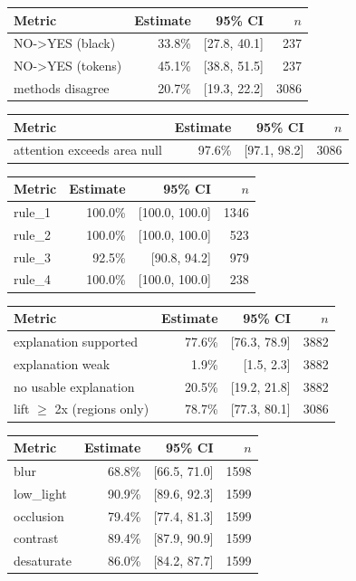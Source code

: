 \begin{tabular}{lrrr}
\toprule
Metric & Estimate & 95\% CI & $n$ \\
\midrule
NO->YES (black) & 33.8\% & [27.8, 40.1] & 237 \\
NO->YES (tokens) & 45.1\% & [38.8, 51.5] & 237 \\
methods disagree & 20.7\% & [19.3, 22.2] & 3086 \\
\bottomrule
\end{tabular}

\begin{tabular}{lrrr}
\toprule
Metric & Estimate & 95\% CI & $n$ \\
\midrule
attention exceeds area null & 97.6\% & [97.1, 98.2] & 3086 \\
\bottomrule
\end{tabular}

\begin{tabular}{lrrr}
\toprule
Metric & Estimate & 95\% CI & $n$ \\
\midrule
rule\_1 & 100.0\% & [100.0, 100.0] & 1346 \\
rule\_2 & 100.0\% & [100.0, 100.0] & 523 \\
rule\_3 & 92.5\% & [90.8, 94.2] & 979 \\
rule\_4 & 100.0\% & [100.0, 100.0] & 238 \\
\bottomrule
\end{tabular}

\begin{tabular}{lrrr}
\toprule
Metric & Estimate & 95\% CI & $n$ \\
\midrule
explanation supported & 77.6\% & [76.3, 78.9] & 3882 \\
explanation weak & 1.9\% & [1.5, 2.3] & 3882 \\
no usable explanation & 20.5\% & [19.2, 21.8] & 3882 \\
lift $\geq$ 2x (regions only) & 78.7\% & [77.3, 80.1] & 3086 \\
\bottomrule
\end{tabular}

\begin{tabular}{lrrr}
\toprule
Metric & Estimate & 95\% CI & $n$ \\
\midrule
blur & 68.8\% & [66.5, 71.0] & 1598 \\
low\_light & 90.9\% & [89.6, 92.3] & 1599 \\
occlusion & 79.4\% & [77.4, 81.3] & 1599 \\
contrast & 89.4\% & [87.9, 90.9] & 1599 \\
desaturate & 86.0\% & [84.2, 87.7] & 1599 \\
\bottomrule
\end{tabular}

